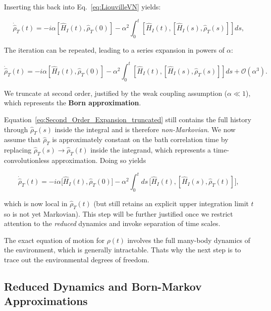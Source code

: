\noindent
Inserting this back into Eq.~\eqref{eq:LiouvilleVN} yields:

\begin{equation}
	\dot{\hat{\rho}}_T(t) = -i \alpha \left[ \hat{H}_I(t), \hat{\rho}_T(0) \right]
	- \alpha^2 \int_0^t \left[ \hat{H}_I(t), \left[ \hat{H}_I(s), \hat{\rho}_T(s) \right] \right] ds,
	\label{eq:Second_Order_Expansion}
\end{equation}

\noindent
The iteration can be repeated, leading to a series expansion in powers of $\alpha$:

\begin{equation}
	\dot{\hat{\rho}}_T(t) = -i \alpha \left[ \hat{H}_I(t), \hat{\rho}_T(0) \right]
	- \alpha^2 \int_0^t \left[ \hat{H}_I(t), \left[ \hat{H}_I(s), \hat{\rho}_T(s) \right] \right] ds + \mathcal{O} (\alpha^3).
	\label{eq:Second_Order_Expansion_truncated}
\end{equation}

\noindent
We truncate at second order, justified by the weak coupling assumption ($\alpha \ll 1$), which represents the \textbf{Born approximation}.

\noindent
Equation~\eqref{eq:Second_Order_Expansion_truncated} still contains the full history through $\hat{\rho}_T(s)$ inside the integral and is therefore \emph{non-Markovian}. We now assume that $\hat{\rho}_T$ is approximately constant on the bath correlation time by replacing $\hat{\rho}_T(s) \to \hat{\rho}_T(t)$ inside the integrand, which represents a time-convolutionless approximation. Doing so yields

\begin{equation}
	\dot{\hat{\rho}}_T(t) = -i \alpha \big[ \hat{H}_I(t), \hat{\rho}_T(0) \big]
	- \alpha^2 \int_0^t ds\, \big[ \hat{H}_I(t), [ \hat{H}_I(s), \hat{\rho}_T(t)] \big],
	\label{eq:Second_Order_Expansion_wo_third}
\end{equation}

\noindent
which is now local in $\hat{\rho}_T(t)$ (but still retains an explicit upper integration limit $t$ so is not yet Markovian). This step will be further justified once we restrict attention to the \emph{reduced} dynamics and invoke separation of time scales.

\noindent
The exact equation of motion for $\rho(t)$ involves the full many-body dynamics of the environment, which is generally intractable. Thats why the next step is to trace out the environmental degrees of freedom.


\subsection{Reduced Dynamics and Born-Markov Approximations}


